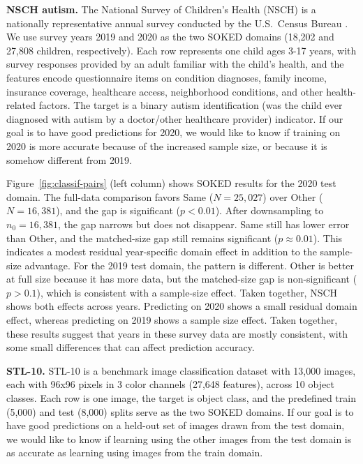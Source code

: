 \documentclass[twoside]{article}
\begin{document}
\textbf{NSCH autism.}
The National Survey of Children's Health (NSCH) is a nationally representative annual survey conducted by the U.S.\ Census Bureau \citep{NSCH2019,NSCH2020}.
We use survey years 2019 and 2020 as the two SOKED domains (18,202 and 27,808 children, respectively).
Each row represents one child ages 3-17 years, with survey responses provided by an adult familiar with the child's health, and the features encode questionnaire items on condition diagnoses, family income, insurance coverage, healthcare access, neighborhood conditions, and other health-related factors.
The target is a binary autism identification (was the child ever diagnosed with autism by a doctor/other healthcare provider) indicator.
If our goal is to have good predictions for 2020, we would like to know if training on 2020 is more accurate because of the increased sample size, or because it is somehow different from 2019.

Figure~\ref{fig:classif-pairs} (left column) shows SOKED results for the 2020 test domain.
The full-data comparison favors Same ($N=25{,}027$) over Other ($N=16{,}381$), and the gap is significant ($p < 0.01$).
After downsampling to $n_0 = 16{,}381$, the gap narrows but does not disappear.
Same still has lower error than Other, and the matched-size gap still remains significant ($p \approx 0.01$).
This indicates a modest residual year-specific domain effect in addition to the sample-size advantage.
For the 2019 test domain, the pattern is different.
Other is better at full size because it has more data, but the matched-size gap is non-significant ($p > 0.1$), which is consistent with a sample-size effect.
Taken together, NSCH shows both effects across years.
Predicting on 2020 shows a small residual domain effect, whereas predicting on 2019 shows a sample size effect.
Taken together, these results suggest that years in these survey data are mostly consistent, with some small differences that can affect prediction accuracy.

\textbf{STL-10.}
STL-10 is a benchmark image classification dataset \citep{coates2011stl10} with 13,000 images, each with 96x96 pixels in 3 color channels (27,648 features), across 10 object classes.
Each row is one image, the target is object class, and the predefined train (5,000) and test (8,000) splits serve as the two SOKED domains.
If our goal is to have good predictions on a held-out set of images drawn from the test domain, we would like to know if learning using the other images from the test domain is as accurate as learning using images from the train domain.
\end{document}
